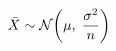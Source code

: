 \documentclass[preview]{standalone}
\begin{document}
\begin{align*}
\special{dvisvgm:raw <g id='unique000'>}\bar{X} \sim \mathcal{N}\!\left(\mu,\;\frac{\sigma^2}{n}\right)\special{dvisvgm:raw </g>}
\end{align*}
\end{document}
